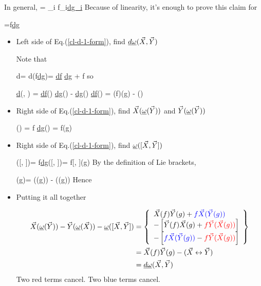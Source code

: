 In general, 
\beq
\ul{\omega} =
\sum_i
f_i\ul{dg_i}
\eeq
Because of linearity,
it's
enough to prove this claim for

\beq
\ul{\omega}=f\ul{dg}
\eeq

\begin{itemize}
\item Left side
of Eq.(\ref{cl-d-1-form}), 
find
$\ul{d\omega}(\vecX, \vecY)$

Note that

\beq
d\ul{\omega}=
d(f\ul{dg})=
\ul{df}
\wedge \ul{dg}
+ f 
\eeq
so


\beq
\boxed
{\ul{d\omega}(\vecX, \vecY) =
\ul{df}(\vecX)
\ul{dg}(\vecY)
-
\ul{dg}(\vecX)
\ul{df}(\vecY)
=
\vecX(f)\vecY(g)
-
(\vecX \swap \vecY)}
\eeq

\item Right side
of Eq.(\ref{cl-d-1-form}),
find $\vecX(\ul{\omega}(\vecY))$ and
$\vecY(\ul{\omega}(\vecY))$

\beq
\ul{\omega}(\vecY)
= f \ul{dg}(\vecY)
=
f\vecY(g)
\eeq

\beq
{}
\label{eq-x-omega-y}
\eeq

\beq
{}
\eeq

\item Right side of Eq.(\ref{cl-d-1-form}),
find $\ul{\omega}([\vecX, \vecY])$

\beq
\ul{\omega}([\vecX, \vecY])=
f\ul{dg}([\vecX, \vecY])=
f[\vecX, \vecY](g)
\eeq
By the definition of Lie brackets,

\beq
[\vecX, \vecY](g)=
\vecX(\vecY(g))
-
\vecY(\vecX(g))
\eeq
Hence

\beq
{}
\eeq

\item Putting it all together

\begin{align}
\vecX(\ul{\omega}(\vecY))-\vecY(\ul{\omega}(\vecX))
-
\ul{\omega}
(
[\vecX, \vecY]
)
&=
\left\{
\begin{array}{l}
\vecX(f)\vecY(g)
+
{\color{blue}f\vecX(\vecY(g))}
\\
-\left[
\vecY(f)\vecX(g)
+
{\color{red}f\vecY(\vecX(g))}
\right]
\\
-\left[
{\color{blue}f\vecX(\vecY(g))}-
{\color{red}f\vecY(\vecX(g))}
\right]
\end{array}
\right\}
\\
&=
\vecX(f)\vecY(g)
-
(\vecX\swap \vecY)
\\
&=
\ul{d\omega}
(\vecX, \vecY)
\end{align}
Two red terms cancel. Two blue
terms cancel.
\end{itemize}

